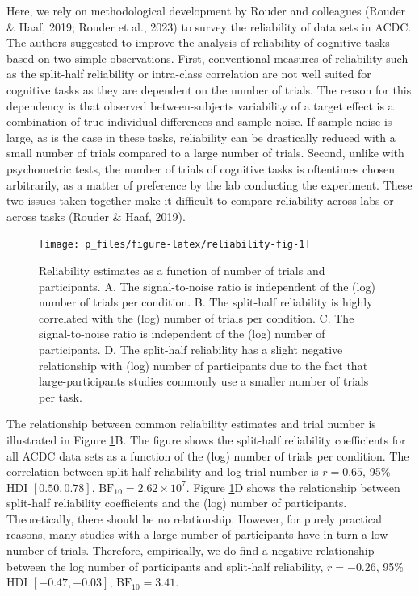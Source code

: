 \documentclass[
  man,floatsintext]{apa6}
\begin{document}
Here, we rely on methodological development by Rouder and colleagues (Rouder \& Haaf, 2019; Rouder et al., 2023) to survey the reliability of data sets in ACDC. The authors suggested to improve the analysis of reliability of cognitive tasks based on two simple observations. First, conventional measures of reliability such as the split-half reliability or intra-class correlation are not well suited for cognitive tasks as they are dependent on the number of trials. The reason for this dependency is that observed between-subjects variability of a target effect is a combination of true individual differences and sample noise. If sample noise is large, as is the case in these tasks, reliability can be drastically reduced with a small number of trials compared to a large number of trials. Second, unlike with psychometric tests, the number of trials of cognitive tasks is oftentimes chosen arbitrarily, as a matter of preference by the lab conducting the experiment. These two issues taken together make it difficult to compare reliability across labs or across tasks (Rouder \& Haaf, 2019).



\begin{figure}

{\centering \texttt{[image: p\_files/figure-latex/reliability-fig-1]} 

}

\caption{Reliability estimates as a function of number of trials and participants. A. The signal-to-noise ratio is independent of the (log) number of trials per condition. B. The split-half reliability is highly correlated with the (log) number of trials per condition. C. The signal-to-noise ratio is independent of the (log) number of participants. D. The split-half reliability has a slight negative relationship with (log) number of participants due to the fact that large-participants studies commonly use a smaller number of trials per task.}\label{fig:reliability-fig}
\end{figure}

The relationship between common reliability estimates and trial number is illustrated in Figure \ref{fig:reliability-fig}B. The figure shows the split-half reliability coefficients for all ACDC data sets as a function of the (log) number of trials per condition. The correlation between split-half-reliability and log trial number is \(r = 0.65\), 95\% HDI \([0.50, 0.78]\), \(\mathrm{BF}_{\textrm{10}} = 2.62 \times 10^{7}\). Figure \ref{fig:reliability-fig}D shows the relationship between split-half reliability coefficients and the (log) number of participants. Theoretically, there should be no relationship. However, for purely practical reasons, many studies with a large number of participants have in turn a low number of trials. Therefore, empirically, we do find a negative relationship between the log number of participants and split-half reliability, \(r = -0.26\), 95\% HDI \([-0.47, -0.03]\), \(\mathrm{BF}_{\textrm{10}} = 3.41\).
\end{document}
